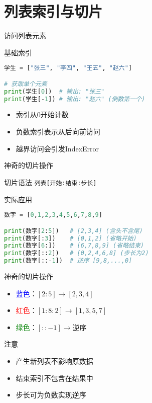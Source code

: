 \documentclass{beamer}
\begin{document}
\section{列表索引与切片}
\begin{frame}[fragile]{访问列表元素}
\begin{block}{基础索引}
\begin{lstlisting}[language=Python]
学生 = ["张三", "李四", "王五", "赵六"]

# 获取单个元素
print(学生[0])  # 输出: "张三" 
print(学生[-1]) # 输出: "赵六" (倒数第一个)
\end{lstlisting}
\begin{itemize}
\item 索引从\colorbox{cuhksz3}{0}开始计数
\item 负数索引表示\colorbox{cuhksz3}{从后向前}访问
\item 越界访问会引发\colorbox{cuhksz3}{IndexError}
\end{itemize}
\end{block}

\end{frame}

\begin{frame}[fragile]{神奇的切片操作}
\begin{block}{切片语法}
\centering
\texttt{列表[开始:结束:步长]}
\end{block}

\begin{exampleblock}{实际应用}
\begin{lstlisting}[language=Python]
数字 = [0,1,2,3,4,5,6,7,8,9]

print(数字[2:5])   # [2,3,4] (含头不含尾)
print(数字[:3])    # [0,1,2] (省略开始)
print(数字[6:])    # [6,7,8,9] (省略结束)
print(数字[::2])   # [0,2,4,6,8] (步长为2)
print(数字[::-1])  # 逆序 [9,8,...,0]
\end{lstlisting}
\end{exampleblock}
\end{frame}

\begin{frame}{神奇的切片操作}

\begin{itemize}
\item \textcolor{blue}{蓝色}：$[2:5] \to [2,3,4]$
\item \textcolor{red}{红色}：$[1:8:2] \to [1,3,5,7]$
\item \textcolor{green}{绿色}：$[::-1]  \to \text{逆序}$
\end{itemize}
\begin{alertblock}{注意}
\begin{itemize}
\item 产生\colorbox{cuhksz3}{新列表}不影响原数据
\item 结束索引\colorbox{cuhksz3}{不包含}在结果中
\item 步长可为负数实现\colorbox{cuhksz3}{逆序}
\end{itemize}
\end{alertblock}
\end{frame}
\end{document}
